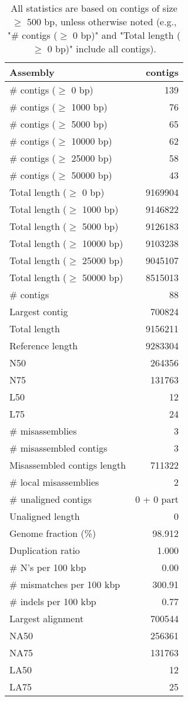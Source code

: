 \documentclass[12pt,a4paper]{article}
\begin{document}
\begin{table}[ht]
\begin{center}
\caption{All statistics are based on contigs of size $\geq$ 500 bp, unless otherwise noted (e.g., "\# contigs ($\geq$ 0 bp)" and "Total length ($\geq$ 0 bp)" include all contigs).}
\begin{tabular}{|l*{1}{|r}|}
\hline
Assembly & contigs \\ \hline
\# contigs ($\geq$ 0 bp) & 139 \\ \hline
\# contigs ($\geq$ 1000 bp) & 76 \\ \hline
\# contigs ($\geq$ 5000 bp) & 65 \\ \hline
\# contigs ($\geq$ 10000 bp) & 62 \\ \hline
\# contigs ($\geq$ 25000 bp) & 58 \\ \hline
\# contigs ($\geq$ 50000 bp) & 43 \\ \hline
Total length ($\geq$ 0 bp) & 9169904 \\ \hline
Total length ($\geq$ 1000 bp) & 9146822 \\ \hline
Total length ($\geq$ 5000 bp) & 9126183 \\ \hline
Total length ($\geq$ 10000 bp) & 9103238 \\ \hline
Total length ($\geq$ 25000 bp) & 9045107 \\ \hline
Total length ($\geq$ 50000 bp) & 8515013 \\ \hline
\# contigs & 88 \\ \hline
Largest contig & 700824 \\ \hline
Total length & 9156211 \\ \hline
Reference length & 9283304 \\ \hline
N50 & 264356 \\ \hline
N75 & 131763 \\ \hline
L50 & 12 \\ \hline
L75 & 24 \\ \hline
\# misassemblies & 3 \\ \hline
\# misassembled contigs & 3 \\ \hline
Misassembled contigs length & 711322 \\ \hline
\# local misassemblies & 2 \\ \hline
\# unaligned contigs & 0 + 0 part \\ \hline
Unaligned length & 0 \\ \hline
Genome fraction (\%) & 98.912 \\ \hline
Duplication ratio & 1.000 \\ \hline
\# N's per 100 kbp & 0.00 \\ \hline
\# mismatches per 100 kbp & 300.91 \\ \hline
\# indels per 100 kbp & 0.77 \\ \hline
Largest alignment & 700544 \\ \hline
NA50 & 256361 \\ \hline
NA75 & 131763 \\ \hline
LA50 & 12 \\ \hline
LA75 & 25 \\ \hline
\end{tabular}
\end{center}
\end{table}
\end{document}
